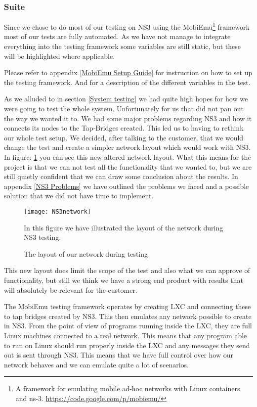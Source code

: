 \subsubsection{Suite}\label{Testing:About:Suite}
	Since we chose to do most of our testing on NS3 using the MobiEmu\footnote{A framework for emulating mobile ad-hoc networks with Linux containers and ns-3. \url{https://code.google.com/p/mobiemu/}} framework most of our tests are fully automated. As we have not manage to integrate everything into the testing framework some variables are still static, but these will be highlighted where applicable.

	\begin{shaded}
	Please refer to appendix \ref{MobiEmu Setup Guide} for instruction on how to set up the testing framework. And for a description of the different variables in the test.
	\end{shaded}
	
	As we alluded to in section \ref{System testing} we had quite high hopes for how we were going to test the whole system. Unfortunately for us that did not pan out the way we wanted it to. We had some major problems regarding NS3 and how it connects its nodes to the Tap-Bridges created. This led us to having to rethink our whole test setup. We decided, after talking to the customer, that we would change the test and create a simpler network layout which would work with NS3. In figure: \ref{fig:NS3network} you can see this new altered network layout. What this means for the project is that we can not test all the functionality that we wanted to, but we are still quietly confident that we can draw some conclusion about the results. In appendix \ref{NS3 Problems} we have outlined the problems we faced and a possible solution that we did not have time to implement.
	
	\begin{figure}[H]
        \centering
        \texttt{[image: NS3network]}
        \caption{The layout of our network during testing}
        In this figure we have illustrated the layout of the network during NS3 testing.
        \label{fig:NS3network}
    \end{figure}
    
    This new layout does limit the scope of the test and also what we can approve of functionality, but still we think we have a strong end product with results that will absolutely be relevant for the customer.
    
    The MobiEmu testing framework operates by creating \gls{LXC} and connecting these to tap bridges created by NS3. This then emulates any network possible to create in NS3. From the point of view of programs running inside the LXC, they are full Linux machines connected to a real network. This means that any program able to run on Linux should run properly inside the LXC and any messages they send out is sent through NS3. This means that we have full control over how our network behaves and we can emulate quite a lot of scenarios.
    
